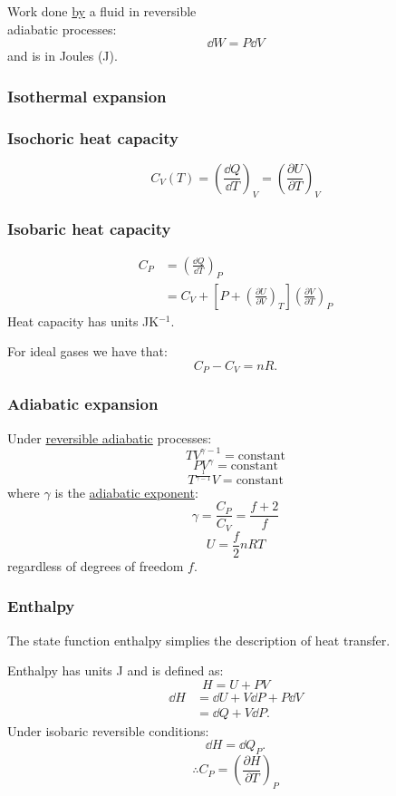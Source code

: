 \documentclass{article}
\begin{document}
\begin{multicols*}{3}
Work done \underline{by} a fluid
in reversible \\
adiabatic processes:
$$\dd W=P\dd V$$
and is in Joules (J).

\subsubsection*{Isothermal expansion}

\subsubsection*{Isochoric heat capacity}
$$C_V(T)=\left(\frac{\dd Q}{\dd T}\right)_V
=\left(\frac{\partial U}{\partial T}\right)_V$$

\subsubsection*{Isobaric heat capacity}
\begin{align*}
    C_P
    &=\left(\frac{\dd Q}{\dd T}\right)_P \\
    &=C_V+\left[P+
    \left(\frac{\partial U}{\partial V}\right)_T\right]
    \left(\frac{\partial V}{\partial T}\right)_P
\end{align*}
Heat capacity has units JK$^{-1}$.

For ideal gases we have that:
$$C_P-C_V=nR.$$

\subsubsection*{Adiabatic expansion}
Under \underline{reversible adiabatic} processes:
$$TV^{\gamma-1}=\text{constant}$$
$$PV^{\gamma}=\text{constant}$$
$$T^{\frac{1}{\gamma-1}}V=\text{constant}$$
where $\gamma$ is the \underline{adiabatic exponent}:
$$\gamma=\frac{C_P}{C_V}
=\frac{f+2}{f}$$
$$U=\frac{f}{2}nRT$$
regardless of degrees of freedom $f$.

\subsubsection*{Enthalpy}
The state function enthalpy simplies the
description of heat transfer. 

Enthalpy has units J
and is defined as:
$$H=U+PV$$
\begin{align*}
    \dd H
    &=\dd U+V\dd P+P\dd V \\
    &=\dd Q+V\dd P.
\end{align*}
Under isobaric reversible conditions:
$$\dd H=\dd Q_P.$$
$$\therefore C_P
=\left(\frac{\partial H}{\partial T}\right)_P$$


\end{multicols*}
\end{document}
